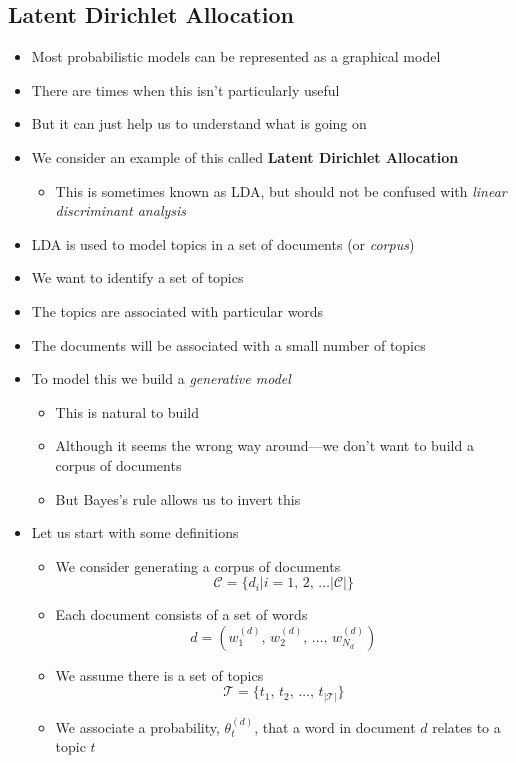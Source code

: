 \documentclass[11pt]{article}
\begin{document}
\subsection{Latent Dirichlet Allocation}
\label{sec:orgee1e360}
\begin{itemize}
\item Most probabilistic models can be represented as a graphical model
\item There are times when this isn't particularly useful
\item But it can just help us to understand what is going on
\item We consider an example of this  called \textbf{Latent Dirichlet Allocation}
\begin{itemize}
\item This is sometimes known as LDA, but should not be confused with
\emph{linear discriminant analysis}
\end{itemize}
\item LDA is used to model topics in a set of documents (or \emph{corpus})
\item We want to identify a set of topics
\item The topics are associated with particular words
\item The documents will be associated with a small number of topics
\item To model this we build a \emph{generative model}
\begin{itemize}
\item This is natural to build
\item Although it seems the wrong way around---we don't want to
build a corpus of documents
\item But Bayes's rule allows us to invert this
\end{itemize}
\item Let us start with some definitions
\begin{itemize}
\item We consider generating a corpus of documents
$$ \mathcal{C} = \{d_i | i = 1,\, 2,\, \ldots |\mathcal{C}|\} $$
\item Each document consists of a set of words
$$ d = \left(w_1^{(d)},\, w_2^{(d)},\, \ldots,\,
       w_{N_d}^{(d)}\right) $$
\item We assume there is a set of topics
$$ \mathcal{T}=\{t_1,\,t_2,\,\ldots,\, t_{|\mathcal{T}|}\} $$
\item We associate a probability, \(\theta^{(d)}_t\), that a word in
document \(d\) relates to a topic \(t\)

\end{itemize}
\end{itemize}
\end{document}

